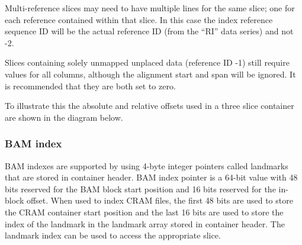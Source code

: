 \documentclass[a4paper]{article}
\begin{document}
Multi-reference slices may need to have multiple lines for the same slice; one for each reference contained within that slice.
In this case the index reference sequence ID will be the actual reference ID (from the ``RI'' data series) and not -2.

Slices containing solely unmapped unplaced data (reference ID -1) still require values for all columns, although the alignment start and span will be ignored.
It is recommended that they are both set to zero.

To illustrate this the absolute and relative offsets used in a three slice container are shown in the diagram below.

\begin{center}
\end{center}

\subsubsection*{BAM index}

BAM indexes are supported by using 4-byte integer pointers called landmarks that 
are stored in container header. BAM index pointer is a 64-bit value with 48 bits 
reserved for the BAM block start position and 16 bits reserved for the in-block 
offset. When used to index CRAM files, the first 48 bits are used to store the 
CRAM container start position and the last 16 bits are used to store the index 
of the landmark in the landmark array stored in  container header. The landmark 
index can be used to access the appropriate slice. 
\end{document}

